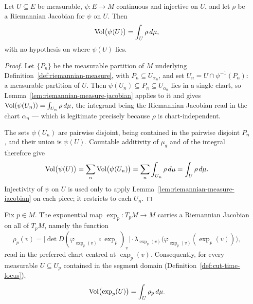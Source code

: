 \begin{lemma}
\label{lem:riemannian-measure-jacobian-global}





Let $U\subseteq E$ be measurable, $\psi\colon E\to M$ continuous and
injective on $U$, and let $\rho$ be a Riemannian Jacobian for $\psi$ on
$U$. Then
$$\operatorname{Vol}\bigl(\psi(U)\bigr)=\int_U \rho\,d\mu,$$
with no hypothesis on where $\psi(U)$ lies.
\end{lemma}

\begin{proof}
\sketch
{}

Let $\{P_n\}$ be the measurable partition of $M$ underlying
Definition~\ref{def:riemannian-measure}, with $P_n\subseteq
U_{\alpha_n}$, and set $U_n=U\cap\psi^{-1}(P_n)$: a measurable
partition of $U$. Then $\psi(U_n)\subseteq P_n\subseteq U_{\alpha_n}$
lies in a single chart, so
Lemma~\ref{lem:riemannian-measure-jacobian} applies to it and gives
$\operatorname{Vol}(\psi(U_n))=\int_{U_n}\rho\,d\mu$, the integrand being the
Riemannian Jacobian read in the chart $\alpha_n$ --- which is
legitimate precisely because $\rho$ is chart-independent.

The sets $\psi(U_n)$ are pairwise disjoint, being contained in the
pairwise disjoint $P_n$, and their union is $\psi(U)$. Countable
additivity of $\mu_g$ and of the integral therefore give
$$\operatorname{Vol}\bigl(\psi(U)\bigr)=\sum_n\operatorname{Vol}\bigl(\psi(U_n)\bigr)
=\sum_n\int_{U_n}\rho\,d\mu=\int_U\rho\,d\mu.$$
Injectivity of $\psi$ on $U$ is used only to apply
Lemma~\ref{lem:riemannian-measure-jacobian} on each piece; it restricts
to each $U_n$.
\end{proof}

\begin{lemma}
\label{lem:exponential-riemannian-jacobian}




Fix $p\in M$. The exponential map $\exp_p\colon T_pM\to M$ carries a Riemannian
Jacobian on all of $T_pM$, namely the function
$$\rho_p(v)=\bigl\lvert\det D(\varphi_{\exp_p(v)}\circ\exp_p)_v\bigr\rvert\cdot
  \lambda_{\exp_p(v)}\bigl(\varphi_{\exp_p(v)}(\exp_p(v))\bigr),$$
read in the preferred chart centred at $\exp_p(v)$. Consequently, for every measurable
$U\subseteq U_p$ contained in the segment domain (Definition~\ref{def:cut-time-locus}),
$$\operatorname{Vol}\bigl(\operatorname{exp}_p(U)\bigr)=\int_U\rho_p\,d\mu.$$
\end{lemma}


